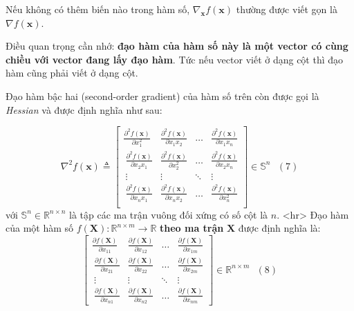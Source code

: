 Nếu không có thêm biến nào trong hàm số, $\nabla_{\mathbf{x}}f(\mathbf{x})$ thường được viết gọn là $\nabla f(\mathbf{x})$. 
 
Điều quan trọng cần nhớ: \textbf{đạo hàm của hàm số này là một vector có cùng chiều với vector đang lấy đạo hàm}. Tức nếu vector viết ở dạng cột thì đạo hàm cũng phải viết ở dạng cột.  
 
Đạo hàm bậc hai (second-order gradient) của hàm số trên còn được gọi là \textit{Hessian} và được định nghĩa như sau:  
 
\begin{equation*} 
\nabla^2 f(\mathbf{x}) \triangleq 
\left[ 
\begin{matrix} 
    \frac{\partial^2 f(\mathbf{x})}{\partial x_1^2} & \frac{\partial^2 f(\mathbf{x})}{\partial x_1x_2} & \dots & \frac{\partial^2 f(\mathbf{x})}{\partial x_1x_n} \\\  
    \frac{\partial^2 f(\mathbf{x})}{\partial x_2x_1} & \frac{\partial^2 f(\mathbf{x})}{\partial x_2^2} & \dots & \frac{\partial^2 f(\mathbf{x})}{\partial x_2x_n} \\\  
    \vdots & \vdots & \ddots & \vdots \\\ 
    \frac{\partial^2 f(\mathbf{x})}{\partial x_nx_1} & \frac{\partial^2 f(\mathbf{x})}{\partial x_nx_2} & \dots & \frac{\partial^2 f(\mathbf{x})}{\partial x_n^2} \\\  
\end{matrix} 
\right] \in \mathbb{S}^{n} ~~~ (7) 
\end{equation*}  
với $\mathbb{S}^{n} \in \mathbb{R}^{n \times n}$ là tập các ma trận vuông đối xứng có số cột là $n$. 
<hr> 
Đạo hàm của một hàm số $f(\mathbf{X}): \mathbb{R}^{n \times m} \rightarrow \mathbb{R}$ \textbf{theo ma trận} $\mathbf{X}$ được định nghĩa là:  
\begin{equation*} 
\left[ 
\begin{matrix} 
    \frac{\partial f(\mathbf{X})}{\partial x_{11}} & \frac{\partial f(\mathbf{X})}{\partial x_{12}} & \dots & \frac{\partial f(\mathbf{X})}{\partial x_{1m}} \\\ 
    \frac{\partial f(\mathbf{X})}{\partial x_{21}} & \frac{\partial f(\mathbf{X})}{\partial x_{22}} & \dots & \frac{\partial f(\mathbf{X})}{\partial x_{2m}} \\\ 
    \vdots & \vdots & \ddots & \vdots \\\ 
    \frac{\partial f(\mathbf{X})}{\partial x_{n1}} & \frac{\partial f(\mathbf{X})}{\partial x_{n2}} & \dots & \frac{\partial f(\mathbf{X})}{\partial x_{nm}}  
\end{matrix} 
\right] \in \mathbb{R}^{n \times m} ~~~ (8) 
\end{equation*} 
 
